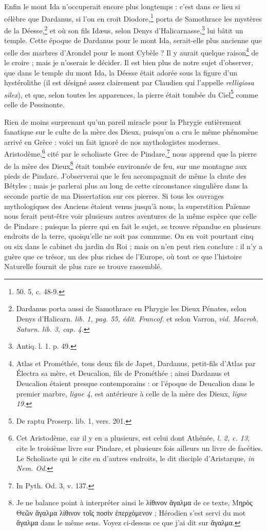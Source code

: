 \documentclass[a4paper, 11pt, oneside, polutonikogreek, french]{article}
\begin{document}
Enfin le mont Ida n'occuperait encore plus longtemps : c'est dans ce lieu si célèbre que Dardanus, si l'on en croit Diodore,\footnote{50. 5, c. 48-9.} porta de Samothrace les mystères de la Déesse,\footnote{Dardanus porta aussi de Samothrace en Phrygie les Dieux Pénates, selon Denys d'Halicarn. \emph{lib. 1, pag. 55, édit. Francof.} et selon Varron, \emph{vid. Macrob. Saturn. lib. 3, cap. 4.}} et où son fils Idæus, selon Denys d'Halicarnasse,\footnote{Antiq. l. 1. p. 49.} lui bâtit un temple. Cette époque de Dardanus pour le mont Ida, serait-elle plus ancienne que celle des marbres d'Arondel pour le mont Cybèle ? Il y aurait quelque raison\footnote{Atlas et Prométhée, tous deux fils de Japet, Dardanus, petit-fils d'Atlas par Électra sa mère, et Deucalion, fils de Prométhée ; ainsi Dardanus et Deucalion étaient presque contemporains : or l'époque de Deucalion dans le premier marbre, \emph{ligne 4}, est antérieure à celle de la mère des Dieux, \emph{ligne 19.}} de le croire ; mais je n'oserais le décider. Il est bien plus de notre sujet d'observer, que dans le temple du mont Ida, la Déesse était adorée sous la figure d'un hystérolithe (il est désigné assez clairement par Claudien qui l'appelle \emph{relligiosa silex}), et que, selon toutes les apparences, la pierre était tombée du Ciel\footnote{De raptu Proserp. lib. 1, vers. 201.} comme celle de Pessinonte.

Rien de moins surprenant qu'un pareil miracle pour la Phrygie entièrement fanatique sur le culte de la mère des Dieux, puisqu'on a cru le même phénomène arrivé en Grèce : voici un fait ignoré de nos mythologistes modernes. Aristodème,\footnote{Cet Aristodème, car il y en a plusieurs, est celui dont Athénée, \emph{l. 2, c. 13}, cite le troisième livre sur Pindare, et plusieurs fois ailleurs un livre de facéties. Le Scholiaste qui le cite en d'autres endroits, le dit disciple d'Aristarque, \emph{in Nem. Od.}} cité par le scholiaste Grec de Pindare,\footnote{In Pyth. Od. 3, v. 137.} nous apprend que la pierre de la mère des Dieux\footnote{Je ne balance point à interpréter ainsi le λίθινον ἄγαλμα de ce texte, Μηρὸς Θεῶν ἄγαλμα λίθινον τοῖς ποσὶν ἐπερχὁμενον ; Hérodien s'est servi du mot ἄγαλμα dans le même sens. Voyez ci-dessus ce que j'ai dit sur ἄγαλμα.} était tombée environnée de feu, sur une montagne aux pieds de Pindare. J'observerai que le feu accompagnait de même la chute des Bétyles ; mais je parlerai plus au long de cette circonstance singulière dans la seconde partie de ma Dissertation sur ces pierres. Si tous les ouvrages mythologiques des Anciens étaient venus jusqu'à nous, la superstition Païenne nous ferait peut-être voir plusieurs autres aventures de la même espèce que celle de Pindare ; puisque la pierre qui en fait le sujet, se trouve répandue en plusieurs endroits de la terre, quoiqu'elle ne soit pas commune. On en voit pourtant cinq ou six dans le cabinet du jardin du Roi ; mais on n'en peut rien conclure : il n'y a guère que ce trésor, un des plus riches de l'Europe, où tout ce que l'histoire Naturelle fournit de plus rare se trouve rassemblé.
\end{document}
